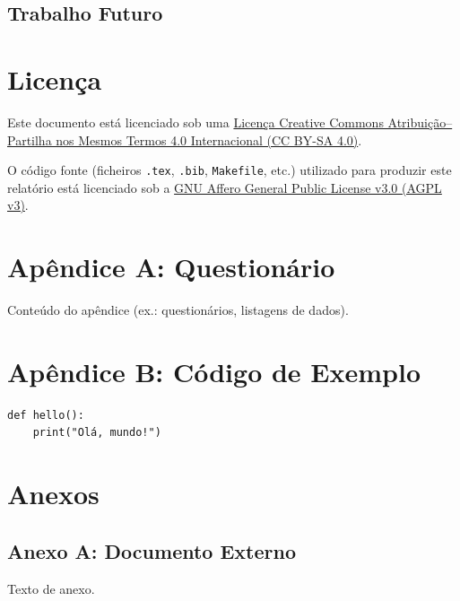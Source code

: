 \documentclass[12pt,a4paper,openright,oneside]{memoir}
\begin{document}


\section{Trabalho Futuro}






\clearpage
\printbibliography[title={Referências Bibliográficas}]

\clearpage
\chapter*{Licença}
\noindent
Este documento está licenciado sob uma
\href{https://creativecommons.org/licenses/by-sa/4.0/}{Licença Creative Commons Atribuição–Partilha nos Mesmos Termos 4.0 Internacional (CC BY-SA 4.0)}.

\vspace{0.5cm}
O código fonte (ficheiros \texttt{.tex}, \texttt{.bib}, \texttt{Makefile}, etc.) utilizado para produzir este relatório está licenciado sob a
\href{https://www.gnu.org/licenses/agpl-3.0.html}{GNU Affero General Public License v3.0 (AGPL v3)}.

\clearpage
\appendix
\chapter{Apêndice A: Questionário}
\label{app:questionario}
Conteúdo do apêndice (ex.: questionários, listagens de dados).

\chapter{Apêndice B: Código de Exemplo}
\label{app:code}
\begin{verbatim}
def hello():
    print("Olá, mundo!")
\end{verbatim}

\backmatter
\chapter*{Anexos}
\section*{Anexo A: Documento Externo}
Texto de anexo.
\end{document}
